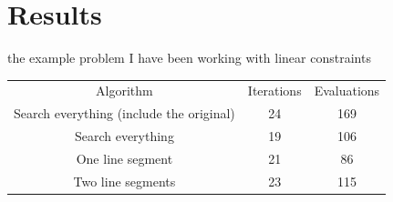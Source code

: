 \documentclass{article}
\begin{document}
\section{Results}

the example problem I have been working with
    linear constraints
%





\begin{center}
\begin{tabular}{ c c c }
 Algorithm & Iterations & Evaluations \\ 
 Search everything (include the original) & 24 & 169 \\  
 Search everything & 19 & 106    \\
 One line segment & 21 & 86 \\
 Two line segments & 23 & 115 \\
\end{tabular}
\end{center}

\newpage



\end{document}
